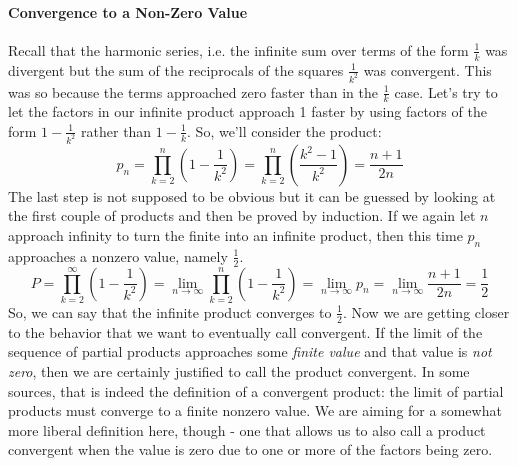 

\paragraph{Convergence to a Non-Zero Value}
Recall that the harmonic series, i.e. the infinite sum over terms of the form $\frac{1}{k}$ was divergent but the sum of the reciprocals of the squares $\frac{1}{k^2}$ was convergent. This was so because the terms approached zero faster than in the $\frac{1}{k}$ case. Let's try to let the factors in our infinite product approach 1 faster by using factors of the form $1 - \frac{1}{k^2}$ rather than $1 - \frac{1}{k}$. So, we'll consider the product:
\begin{equation}
 p_n = \prod_{k=2}^n  \left(1 - \frac{1}{k^2} \right)
     = \prod_{k=2}^n  \left(\frac{k^2-1}{k^2} \right)
     = \frac{n+1}{2n}
\end{equation}
The last step is not supposed to be obvious but it can be guessed by looking at the first couple of products and then be proved by induction.  If we again let $n$ approach infinity to turn the finite into an infinite product, then this time $p_n$ approaches a nonzero value, namely $\frac{1}{2}$.
\begin{equation}
\label{Eq:ProdOneMinusOneOverKSquared}
P = \prod_{k=2}^{\infty} \left(1 - \frac{1}{k^2} \right)
  = \lim_{n \rightarrow \infty} \prod_{k=2}^{n} \left(1 - \frac{1}{k^2} \right)
  = \lim_{n \rightarrow \infty} p_n
  = \lim_{n \rightarrow \infty} \frac{n+1}{2n}
  = \frac{1}{2}
\end{equation}
So, we can say that the infinite product converges to $\frac{1}{2}$. Now we are getting closer to the behavior that we want to eventually call convergent. If the limit of the sequence of partial products approaches some \emph{finite value} and that value is \emph{not zero}, then we are certainly justified to call the product convergent. In some sources, that is indeed the definition of a convergent product: the limit of partial products must converge to a finite nonzero value. We are aiming for a somewhat more liberal definition here, though - one that allows us to also call a product convergent when the value is zero due to one or more of the factors being zero.

